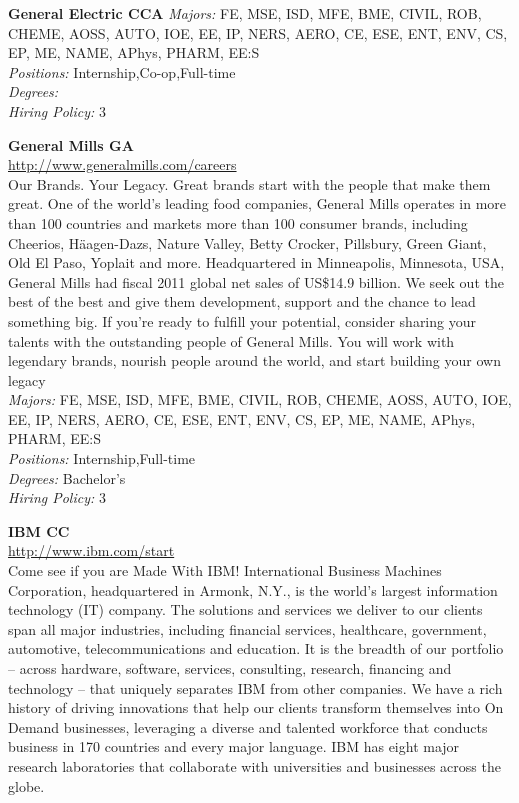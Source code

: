 \documentclass[twoside]{article}
\begin{document}
\begin{center}
\begin{multicols}{2}
\begin{minipage}{.95\columnwidth}{\Large\bf General Electric \hfill CCA}
    \emph{Majors:} FE, MSE, ISD, MFE, BME, CIVIL, ROB, CHEME, AOSS, AUTO, IOE, EE, IP, NERS, AERO, CE, ESE, ENT, ENV, CS, EP, ME, NAME, APhys, PHARM, EE:S\\
    \emph{Positions:} Internship,Co-op,Full-time\\
    \emph{Degrees:} \\
    \emph{Hiring Policy:} 3\\
\end{minipage}
 \begin{minipage}{.95\columnwidth}{\Large\bf General Mills \hfill GA}\\
    \url{http://www.generalmills.com/careers}\\
    Our Brands. Your Legacy. Great brands start with the people that make them great. One of the world's leading food companies, General Mills operates in more than 100 countries and markets more than 100 consumer brands, including Cheerios, Häagen-Dazs, Nature Valley, Betty Crocker, Pillsbury, Green Giant, Old El Paso, Yoplait and more. Headquartered in Minneapolis, Minnesota, USA, General Mills had fiscal 2011 global net sales of US\$14.9 billion. We seek out the best of the best and give them development, support and the chance to lead something big. If you’re ready to fulfill your potential, consider sharing your talents with the outstanding people of General Mills. You will work with legendary brands, nourish people around the world, and start building your own legacy\\
    \emph{Majors:} FE, MSE, ISD, MFE, BME, CIVIL, ROB, CHEME, AOSS, AUTO, IOE, EE, IP, NERS, AERO, CE, ESE, ENT, ENV, CS, EP, ME, NAME, APhys, PHARM, EE:S\\
    \emph{Positions:} Internship,Full-time\\
    \emph{Degrees:} Bachelor's\\
    \emph{Hiring Policy:} 3\\
\end{minipage}
 \begin{minipage}{.95\columnwidth}{\Large\bf IBM \hfill CC}\\
    \url{http://www.ibm.com/start}\\
    Come see if you are Made With IBM! International Business Machines Corporation, headquartered in Armonk, N.Y., is the world's largest information technology (IT) company. The solutions and services we deliver to our clients span all major industries, including financial services, healthcare, government, automotive, telecommunications and education. It is the breadth of our portfolio -- across hardware, software, services, consulting, research, financing and technology -- that uniquely separates IBM from other companies. We have a rich history of driving innovations that help our clients transform themselves into On Demand businesses, leveraging a diverse and talented workforce that conducts business in 170 countries and every major language. IBM has eight major research laboratories that collaborate with universities and businesses across the globe.\\

\end{minipage}
\end{multicols}
\end{center}
\end{document}
